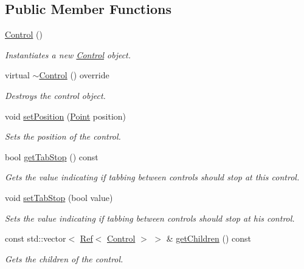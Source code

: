 \subsection*{Public Member Functions}
\begin{DoxyCompactItemize}
\item 
\mbox{\hyperlink{class_control_aa730aeda4517f40bc48ba1e46ebded77}{Control}} ()
\begin{DoxyCompactList}\small\item\em Instantiates a new \mbox{\hyperlink{class_control}{Control}} object. \end{DoxyCompactList}\item 
virtual \mbox{\hyperlink{class_control_a6423be6b157375ac59214eee86623b05}{$\sim$\+Control}} () override
\begin{DoxyCompactList}\small\item\em Destroys the control object. \end{DoxyCompactList}\item 
void \mbox{\hyperlink{class_control_a3a758dd5d74b1e8d6373c0c514a9613c}{set\+Position}} (\mbox{\hyperlink{struct_point}{Point}} position)
\begin{DoxyCompactList}\small\item\em Sets the position of the control. \end{DoxyCompactList}\item 
bool \mbox{\hyperlink{class_control_ac3e5fe103ee3a77c3980bb02771ec38c}{get\+Tab\+Stop}} () const
\begin{DoxyCompactList}\small\item\em Gets the value indicating if tabbing between controls should stop at this control. \end{DoxyCompactList}\item 
void \mbox{\hyperlink{class_control_a73b8872a110ebdea56f9d5a04d115455}{set\+Tab\+Stop}} (bool value)
\begin{DoxyCompactList}\small\item\em Sets the value indicating if tabbing between controls should stop at his control. \end{DoxyCompactList}\item 
const std\+::vector$<$ \mbox{\hyperlink{class_ref}{Ref}}$<$ \mbox{\hyperlink{class_control}{Control}} $>$ $>$ \& \mbox{\hyperlink{class_control_a75bb00f2b4c535741bbc5a70b75ffb82}{get\+Children}} () const
\begin{DoxyCompactList}\small\item\em Gets the children of the control. \end{DoxyCompactList}\item 

\end{DoxyCompactItemize}
